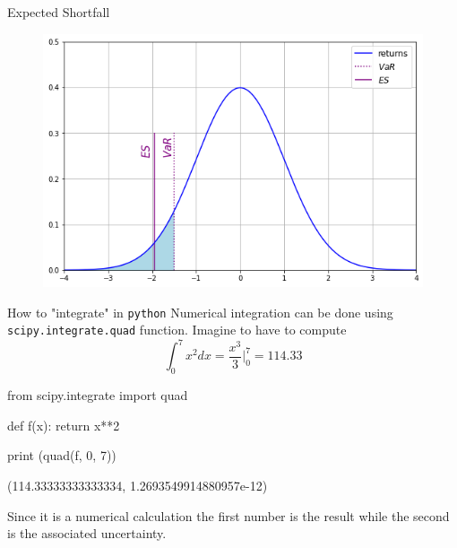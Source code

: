 \documentclass{beamer}
\begin{document}
\begin{frame}{Expected Shortfall}
  \begin{figure}[h]
    \begin{center}
      \includegraphics[width=0.5\linewidth]{es}
    \end{center}
  \end{figure}
\end{frame}

\begin{frame}[fragile]{How to "integrate" in \texttt{python}}
  Numerical integration can be done using \texttt{scipy.integrate.quad} function. Imagine to have to compute
  \begin{equation*}
    \int_{0}^{7} x^2 dx = \frac{x^3}{3}\bigg|_0^7 = 114.33
  \end{equation*}
  \begin{ipython}
from scipy.integrate import quad

def f(x):
  return x**2

print (quad(f, 0, 7))   
\end{ipython}
  \begin{ioutput}
(114.33333333333334, 1.2693549914880957e-12)
\end{ioutput}
Since it is a numerical calculation the first number is the result while the second is the associated uncertainty. 
\end{frame}
\end{document}
